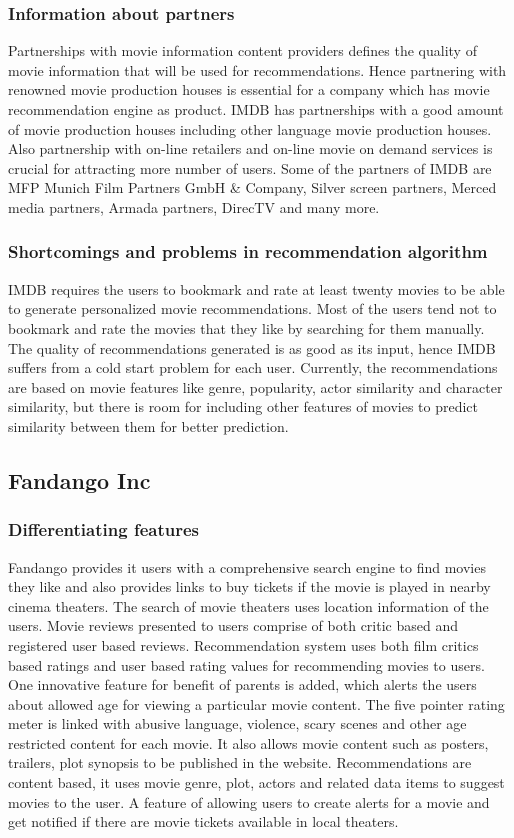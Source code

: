   \subsubsection{Information about partners}
    \label{IMDB_overview_IP}
    Partnerships with movie information content providers defines the quality of movie information that will be used for recommendations. Hence partnering with renowned movie production houses is essential for a company which has movie recommendation engine as product. \acrshort{IMDB} has partnerships with a good amount of movie production houses including other language movie production houses. Also partnership with on-line retailers and on-line movie on demand services is crucial for attracting more number of users. Some of the partners of \acrshort{IMDB} are MFP Munich Film Partners GmbH \& Company, Silver screen partners, Merced media partners, Armada partners, DirecTV and many more.   
  \subsubsection{Shortcomings and problems in recommendation algorithm }
    \label{IMDB_overview_SP}
    \acrshort{IMDB} requires the users to bookmark and rate at least twenty movies to be able to generate personalized movie recommendations. Most of the users tend not to bookmark and rate the movies that they like by searching for them manually. The quality of recommendations generated is as good as its input, hence \acrshort{IMDB} suffers from a cold start problem for each user. Currently, the recommendations are based on movie features like genre, popularity, actor similarity and character similarity, but there is room for including other features of movies to predict similarity between them for better prediction. 
     
  \subsection{Fandango Inc}
   \label{Fandango_overview}
   \subsubsection{Differentiating features}
   Fandango provides it users with a comprehensive search engine to find movies they like and also provides links to buy tickets if the movie is played in nearby cinema theaters. The search of movie theaters uses location information of the users. Movie reviews presented to users comprise of both critic based and registered user based reviews. Recommendation system uses both film critics based ratings and user based rating values for recommending movies to users. One innovative feature for benefit of parents is added, which alerts the users about allowed age for viewing a particular movie content. The five pointer rating meter is linked with abusive language, violence, scary scenes and other age restricted content for each movie. It also allows movie content such as posters, trailers, plot synopsis to be published in the website. Recommendations are content based, it uses movie genre, plot, actors and related data items to suggest movies to the user. A feature of allowing users to create alerts for a movie and get notified if there are movie tickets available in local theaters. 
